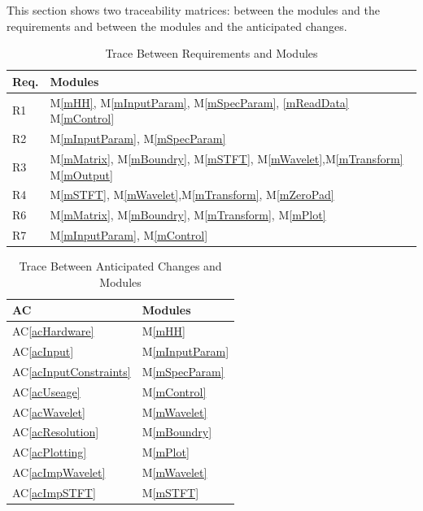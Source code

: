 \documentclass[12pt, titlepage]{article}
\newcommand{\acref}[1]{AC\ref{#1}}
\newcommand{\mref}[1]{M\ref{#1}}
\begin{document}
This section shows two traceability matrices: between the modules and the
requirements and between the modules and the anticipated changes.

\begin{table}[H]
\centering
\begin{tabular}{p{} p{}}
\toprule
\textbf{Req.} & \textbf{Modules}\\
\midrule
R1 & \mref{mHH}, \mref{mInputParam}, \mref{mSpecParam}, \ref{mReadData} \mref{mControl}\\
R2 & \mref{mInputParam}, \mref{mSpecParam}\\
R3 & \mref{mMatrix}, \mref{mBoundry}, \mref{mSTFT}, \mref{mWavelet},\mref{mTransform} \mref{mOutput}\\
R4 &  \mref{mSTFT}, \mref{mWavelet},\mref{mTransform}, \mref{mZeroPad}\\
R6 &   \mref{mMatrix}, \mref{mBoundry}, \mref{mTransform}, \mref{mPlot}\\
R7 &  \mref{mInputParam}, \mref{mControl}\\

\end{tabular}
\caption{Trace Between Requirements and Modules}
\label{TblRT}
\end{table}

\begin{table}[H]
\centering
\begin{tabular}{p{} p{}}
\toprule
\textbf{AC} & \textbf{Modules}\\
\midrule
\acref{acHardware} & \mref{mHH}\\
\acref{acInput} & \mref{mInputParam}\\
\acref{acInputConstraints} & \mref{mSpecParam}\\
\acref{acUseage} & \mref{mControl}\\
\acref{acWavelet} & \mref{mWavelet}\\
\acref{acResolution} & \mref{mBoundry}\\
\acref{acPlotting} & \mref{mPlot}\\
\acref{acImpWavelet} & \mref{mWavelet}\\
\acref{acImpSTFT} & \mref{mSTFT}\\

\bottomrule
\end{tabular}
\caption{Trace Between Anticipated Changes and Modules}
\label{TblACT}
\end{table}
\end{document}
